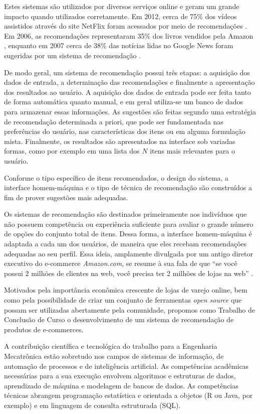 Estes sistemas são utilizados por diversos serviços online e geram um grande impacto quando utilizados corretamente. Em 2012, cerca de 75\% dos vídeos assistidos através do site NetFlix foram acessados por meio de recomendações \cite{netflix75}. Em 2006, as recomendações representaram 35\% dos livros vendidos pela Amazon \cite{amazon35}, enquanto em 2007 cerca de 38\% das notícias lidas no Google News  foram sugeridas por um sistema de recomendação \cite{das2007google}.

De modo geral, um sistema de recomendação possui três etapas: a aquisição dos dados de entrada, a determinação das recomendações e finalmente a apresentação dos resultados ao usuário. A aquisição dos dados de entrada pode ser feita tanto de forma automática quanto manual, e em geral utiliza-se um banco de dados para armazenar essas informações. As sugestões são feitas segundo uma estratégia de recomendação determinada a priori, que pode ser fundamentada nas preferências do usuário, nas características dos itens ou em alguma formulação mista. Finalmente, os resultados são apresentados na interface sob variadas formas, como por exemplo em uma lista dos $N$ itens mais relevantes para o usuário.   

Conforme o tipo específico de itens recomendados, o design do sistema, a interface homem-máquina e o tipo de técnica de recomendação são construídos a fim de prover sugestões mais adequadas.

Os sistemas de recomendação são destinados primeiramente aos indivíduos que não possuem competência ou experiência suficiente para avaliar o grande número de opções do conjunto total de itens. Dessa forma, a interface homem-máquina é adaptada a cada um dos usuários, de maneira que eles recebam recomendações adequadas ao seu perfil. Essa ideia, amplamente divulgada por um antigo diretor executivo do e-commerce \textit{Amazon.com}, se resume à sua fala de que ``se você possui 2 milhões de clientes na web, você precisa ter 2 milhões de lojas na web'' \cite{schafer1999recommender}. 

Motivados pela importância econômica crescente de lojas de varejo online, bem como pela possibilidade de criar um conjunto de ferramentas \textit{open source} que possam ser utilizadas abertamente pela comunidade, propomos como Trabalho de Conclusão de Curso o desenvolvimento de um sistema de recomendação de produtos de e-commerces.  

A contribuição científica e tecnológica do trabalho para a Engenharia Mecatrônica estão sobretudo nos campos de sistemas de informação, de automação de processos e de inteligência artificial. As competências acadêmicas necessárias para a sua execução envolvem algoritmos e estruturas de dados, aprendizado de máquina e modelagem de bancos de dados. As competências técnicas abrangem programação estatística e orientada a objetos (R ou Java, por exemplo) e em linguagem de consulta estruturada (SQL).